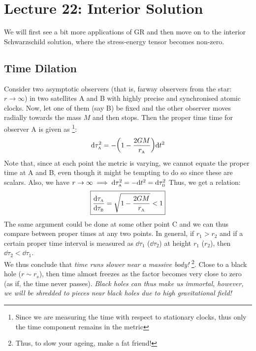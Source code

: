 \section*{Lecture 22: Interior Solution}
We will first see a bit more applications of GR and then move on to the interior Schwarzschild solution, where the stress-energy tensor becomes non-zero. 
\subsection{Time Dilation}
Consider two asymptotic observers (that is, farway observers from the star: $r\to \infty$) in two satellites A and B with highly precise and synchronised atomic clocks. Now, let one of them (say B) be fixed and the other observer moves radially towards the mass $M$ and then stops. Then the proper time time for observer A is given as \footnote{Since we are measuring the time with respect to stationary clocks, thus only the time component remains in the metric}:
\begin{align*}
    \dd \tau^2_{\text{\tiny A}} = -\qty(1- \frac{2GM}{r_{\text{\tiny A}}})\dd t^2
\end{align*}
Note that, since at each point the metric is varying, we cannot equate the proper time at A and B, even though it might be tempting to do so since these are scalars. Also, we have $r\to \infty \implies \dd \tau^2_{\text{\tiny A}} = -\dd t^2 = \dd \tau^2_{\text{\tiny B}}$
Thus, we get a relation:
$$\boxed{\frac{\dd \tau_{\text{\tiny A}}}{\dd \tau_{\text{\tiny B}}} = \sqrt{1- \frac{2GM}{r_{\text{\tiny A}}}}<1}$$
The same argument could be done at some other point C and we can thus compare between proper times at any two points. In general, if $r_1>r_2$ and if a certain proper time interval is measured as $\dd \tau_1$ ($\dd \tau_2$) at height $r_1$ ($r_2$), then  $\dd \tau_2<\dd \tau_1$.\\[0.2cm]
We thus conclude that \textit{time runs slower near a massive body!} \footnote{Thus, to slow your ageing, make a fat friend!}. Close to a black hole ($r\sim r_s$), then time almost freezes as the factor becomes very close to zero (as if, the time never passes). \textit{Black holes can thus make us immortal, however, we will be shredded to pieces near black holes due to high gravitational field!}
